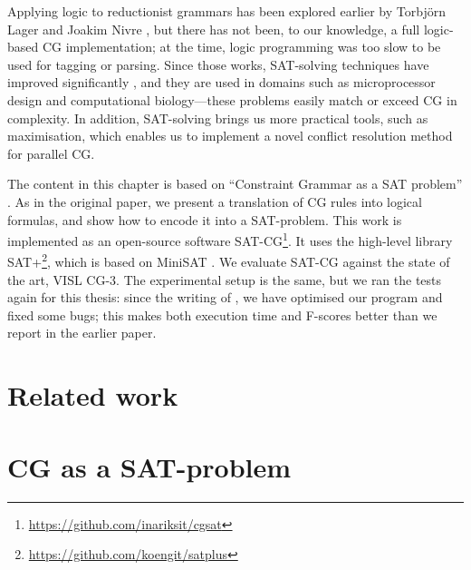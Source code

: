 
Applying logic to reductionist grammars has been explored earlier by Torbjörn Lager and Joakim Nivre \cite{lager98,lager_nivre01}, but there has not been, to our knowledge, a full logic-based CG implementation; at the time, logic programming was too slow to be used for tagging or parsing. 
Since those works, SAT-solving techniques have improved significantly \cite{marques_silva2010}, and they are used in domains such as microprocessor design and computational 
biology---these problems easily match or exceed CG in complexity. 
In addition, SAT-solving brings us more practical tools, such as maximisation, which enables us to implement a novel conflict resolution method for parallel CG.


The content in this chapter is based on ``Constraint Grammar as a SAT problem'' \cite{listenmaa_claessen2015}.
As in the original paper, we present a translation of CG rules into logical formulas, and show how to encode it into a SAT-problem.
This work is implemented as an open-source software SAT-CG\footnote{\url{https://github.com/inariksit/cgsat}}. It uses the high-level library SAT+\footnote{\url{https://github.com/koengit/satplus}}, which is based on MiniSAT \cite{een04sat}.
We evaluate SAT-CG against the state of the art, VISL CG-3.
The experimental setup is the same, but we ran the tests again for this thesis: since the writing of  \cite{listenmaa_claessen2015}, we have optimised our program and fixed some bugs; this 
makes both execution time and F-scores better than we report in the earlier paper. 


\section{Related work}\label{encoding-in-logic}




\section{CG as a SAT-problem}
\label{sec:CGSAT}

